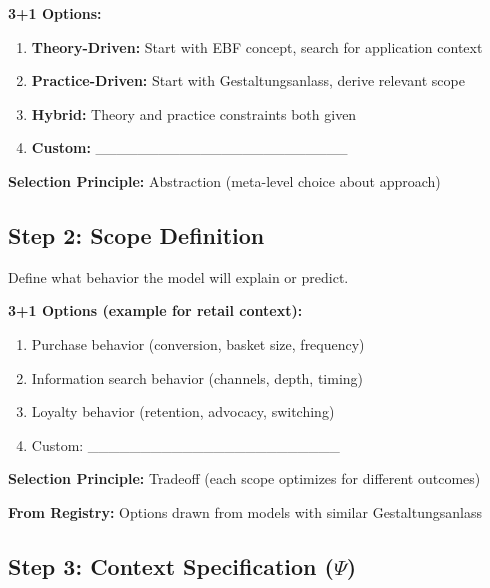 \begin{tcolorbox}[colback=white, colframe=black,
    title=Step 1: Entry Point Selection]
\textbf{3+1 Options:}
\begin{enumerate}
\item[$\square$] \textbf{Theory-Driven:} Start with EBF concept, search for application context
\item[$\square$] \textbf{Practice-Driven:} Start with Gestaltungsanlass, derive relevant scope
\item[$\square$] \textbf{Hybrid:} Theory and practice constraints both given
\item[$\square$] \textbf{Custom:} \_\_\_\_\_\_\_\_\_\_\_\_\_\_\_\_\_\_\_\_\_\_\_\_
\end{enumerate}

\textbf{Selection Principle:} Abstraction (meta-level choice about approach)
\end{tcolorbox}

\subsection{Step 2: Scope Definition}

Define what behavior the model will explain or predict.

\begin{tcolorbox}[colback=white, colframe=black,
    title=Step 2: Scope Definition]
\textbf{3+1 Options (example for retail context):}
\begin{enumerate}
\item[$\square$] Purchase behavior (conversion, basket size, frequency)
\item[$\square$] Information search behavior (channels, depth, timing)
\item[$\square$] Loyalty behavior (retention, advocacy, switching)
\item[$\square$] Custom: \_\_\_\_\_\_\_\_\_\_\_\_\_\_\_\_\_\_\_\_\_\_\_\_
\end{enumerate}

\textbf{Selection Principle:} Tradeoff (each scope optimizes for different outcomes)

\textbf{From Registry:} Options drawn from models with similar Gestaltungsanlass
\end{tcolorbox}

\subsection{Step 3: Context Specification ($\Psi$)}


